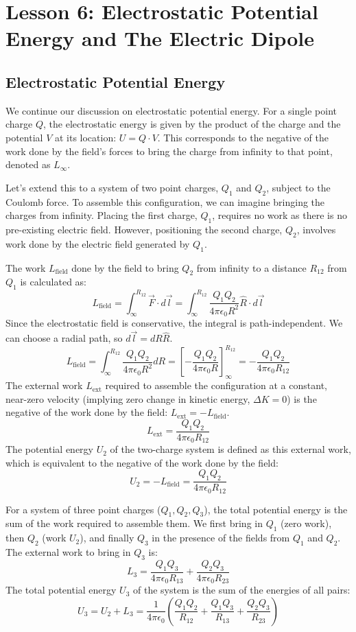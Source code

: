 \section*{Lesson 6: Electrostatic Potential Energy and The Electric Dipole}

\subsection*{Electrostatic Potential Energy}

We continue our discussion on electrostatic potential energy. For a single point charge \(Q\), the electrostatic energy is given by the product of the charge and the potential \(V\) at its location: \(U = Q \cdot V\). This corresponds to the negative of the work done by the field's forces to bring the charge from infinity to that point, denoted as \(L_{\infty}\).

Let's extend this to a system of two point charges, \(Q_1\) and \(Q_2\), subject to the Coulomb force. To assemble this configuration, we can imagine bringing the charges from infinity. Placing the first charge, \(Q_1\), requires no work as there is no pre-existing electric field. However, positioning the second charge, \(Q_2\), involves work done by the electric field generated by \(Q_1\).

The work \(L_{\text{field}}\) done by the field to bring \(Q_2\) from infinity to a distance \(R_{12}\) from \(Q_1\) is calculated as:
\[ L_{\text{field}} = \int_{\infty}^{R_{12}} \vec{F} \cdot d\vec{l} = \int_{\infty}^{R_{12}} \frac{Q_1 Q_2}{4\pi\epsilon_0 R^2} \hat{R} \cdot d\vec{l} \]
Since the electrostatic field is conservative, the integral is path-independent. We can choose a radial path, so \(d\vec{l} = dR \hat{R}\).
\[ L_{\text{field}} = \int_{\infty}^{R_{12}} \frac{Q_1 Q_2}{4\pi\epsilon_0 R^2} dR = \left[ -\frac{Q_1 Q_2}{4\pi\epsilon_0 R} \right]_{\infty}^{R_{12}} = -\frac{Q_1 Q_2}{4\pi\epsilon_0 R_{12}} \]
The external work \(L_{\text{ext}}\) required to assemble the configuration at a constant, near-zero velocity (implying zero change in kinetic energy, \(\Delta K = 0\)) is the negative of the work done by the field: \(L_{\text{ext}} = -L_{\text{field}}\).
\[ L_{\text{ext}} = \frac{Q_1 Q_2}{4\pi\epsilon_0 R_{12}} \]
The potential energy \(U_2\) of the two-charge system is defined as this external work, which is equivalent to the negative of the work done by the field:
\[ U_2 = -L_{\text{field}} = \frac{Q_1 Q_2}{4\pi\epsilon_0 R_{12}} \]

For a system of three point charges (\(Q_1, Q_2, Q_3\)), the total potential energy is the sum of the work required to assemble them. We first bring in \(Q_1\) (zero work), then \(Q_2\) (work \(U_2\)), and finally \(Q_3\) in the presence of the fields from \(Q_1\) and \(Q_2\). The external work to bring in \(Q_3\) is:
\[ L_3 = \frac{Q_1 Q_3}{4\pi\epsilon_0 R_{13}} + \frac{Q_2 Q_3}{4\pi\epsilon_0 R_{23}} \]
The total potential energy \(U_3\) of the system is the sum of the energies of all pairs:
\[ U_3 = U_2 + L_3 = \frac{1}{4\pi\epsilon_0} \left( \frac{Q_1 Q_2}{R_{12}} + \frac{Q_1 Q_3}{R_{13}} + \frac{Q_2 Q_3}{R_{23}} \right) \]

